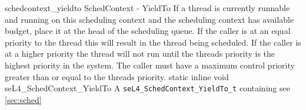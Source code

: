 %
%
%
%

\apidoc
{schedcontext_yieldto}
{SchedContext - YieldTo}
{
If a thread is currently runnable and running on this scheduling context and the scheduling context has available budget, place it at the head of the scheduling queue.
If the caller is at an equal priority to the thread this will result in the thread being scheduled.
If the caller is at a higher priority the thread will not run until the threads priority is the highest priority in the system. 
The caller must have a maximum control priority greater than or equal to the threads priority.
}
{static inline void seL4\_SchedContext\_YieldTo}
{
}
{A \texttt{seL4\_SchedContext\_YieldTo\_t} containing \consumeddesc}
{see \autoref{sec:sched}}
